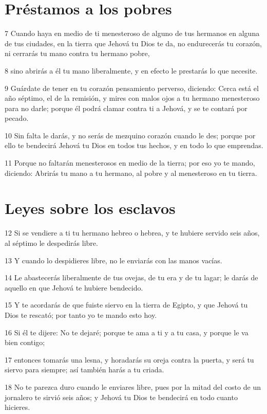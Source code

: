 \section{Préstamos a los pobres}

\par 7 Cuando haya en medio de ti menesteroso de alguno de tus hermanos en alguna de tus ciudades, en la tierra que Jehová tu Dios te da, no endurecerás tu corazón, ni cerrarás tu mano contra tu hermano pobre,
\par 8 sino abrirás a él tu mano liberalmente, y en efecto le prestarás lo que necesite.
\par 9 Guárdate de tener en tu corazón pensamiento perverso, diciendo: Cerca está el año séptimo, el de la remisión, y mires con malos ojos a tu hermano menesteroso para no darle; porque él podrá clamar contra ti a Jehová, y se te contará por pecado.
\par 10 Sin falta le darás, y no serás de mezquino corazón cuando le des; porque por ello te bendecirá Jehová tu Dios en todos tus hechos, y en todo lo que emprendas.
\par 11 Porque no faltarán menesterosos en medio de la tierra; por eso yo te mando, diciendo: Abrirás tu mano a tu hermano, al pobre y al menesteroso en tu tierra.

\section{Leyes sobre los esclavos }

\par 12 Si se vendiere a ti tu hermano hebreo o hebrea, y te hubiere servido seis años, al séptimo le despedirás libre.
\par 13 Y cuando lo despidieres libre, no le enviarás con las manos vacías.
\par 14 Le abastecerás liberalmente de tus ovejas, de tu era y de tu lagar; le darás de aquello en que Jehová te hubiere bendecido.
\par 15 Y te acordarás de que fuiste siervo en la tierra de Egipto, y que Jehová tu Dios te rescató; por tanto yo te mando esto hoy.
\par 16 Si él te dijere: No te dejaré; porque te ama a ti y a tu casa, y porque le va bien contigo;
\par 17 entonces tomarás una lesna, y horadarás su oreja contra la puerta, y será tu siervo para siempre; así también harás a tu criada.
\par 18 No te parezca duro cuando le enviares libre, pues por la mitad del costo de un jornalero te sirvió seis años; y Jehová tu Dios te bendecirá en todo cuanto hicieres. 

